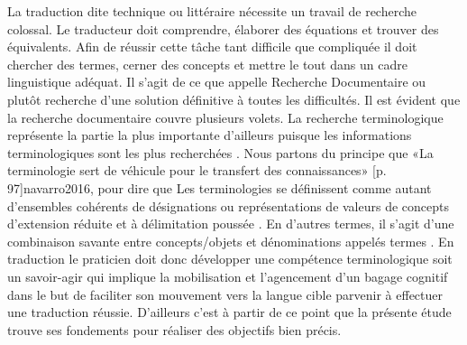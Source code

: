 \documentclass{textolivre}
\begin{document}
La traduction dite technique ou littéraire nécessite un travail de recherche colossal. Le traducteur doit comprendre, élaborer des équations et trouver des équivalents. Afin de réussir cette tâche tant difficile que compliquée il doit chercher des termes, cerner des concepts et mettre le tout dans un cadre linguistique adéquat. Il s’agit de ce que \textcite{gile1994} appelle Recherche Documentaire ou plutôt recherche d’une solution définitive à toutes les difficultés. Il est évident que la recherche documentaire couvre plusieurs volets. La recherche terminologique représente la partie la plus importante d’ailleurs puisque les informations terminologiques sont les plus recherchées \cite{gile1994}. Nous partons du principe que «La terminologie sert de véhicule pour le transfert des connaissances» [p. 97]{navarro2016}, pour dire que Les terminologies se définissent comme autant d’ensembles cohérents de désignations ou représentations de valeurs de concepts d’extension réduite et à délimitation poussée \cite[p. 14]{gouadec2005}. En d’autres termes, il s’agit d’une combinaison savante entre concepts/objets et dénominations appelés termes \cite{durieux1997}. En traduction le praticien doit donc développer une compétence terminologique soit un savoir-agir qui implique la mobilisation et l’agencement d’un bagage cognitif \cite[p. 72]{navarro2016} dans le but de faciliter son mouvement vers la langue cible parvenir à effectuer une traduction réussie. D’ailleurs c’est à partir de ce point que la présente étude trouve ses fondements pour réaliser des objectifs bien précis.
\end{document}
